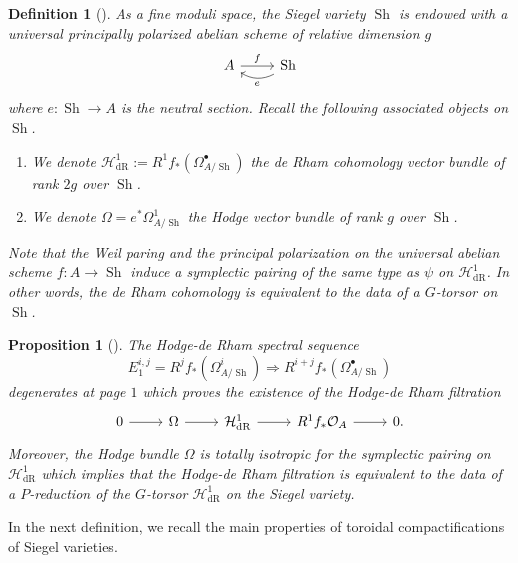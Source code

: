 \documentclass[11pt]{amsart}
\numberwithin{subsection}{section}
\numberwithin{figure}{section}
\numberwithin{table}{section}
\theoremstyle{1}
\newtheorem{proposition}[theorem]{Proposition}
\newtheorem{definition}[theorem]{Definition}
\theoremstyle{2}
\DeclareMathOperator{\Sh}{Sh}
\DeclareMathOperator{\dR}{dR}
\begin{document}
\begin{definition}[\cite{MR1083353}]
As a fine moduli space, the Siegel variety $\Sh$ is endowed with a universal principally polarized abelian scheme of relative dimension $g$
\begin{equation*}
\begin{tikzcd}
A \arrow[r, "f"] & \Sh\arrow[l, "e", bend left]
\end{tikzcd}
\end{equation*}
where $e : \Sh \rightarrow A$ is the neutral section. Recall the following associated objects on $\Sh$.
\begin{enumerate}
\item We denote $\mathcal{H}^1_{\dR} := R^1f_*(\Omega^{\bullet}_{A/\Sh})$ the de Rham cohomology vector bundle of rank $2g$ over $\Sh$.
\item We denote $\Omega =e^*\Omega^1_{A/\Sh}$ the Hodge vector bundle of rank $g$ over $\Sh$.
\end{enumerate}
Note that the Weil paring and the principal polarization on the universal abelian scheme $f : A \rightarrow \Sh$ induce a symplectic pairing of the same type as $\psi$ on $\mathcal{H}^1_{\dR}$. In other words, the de Rham cohomology is equivalent to the data of a $G$-torsor on $\Sh$.
\end{definition}
\vspace*{0.2cm}
\begin{proposition}[\cite{MR894379}]
The Hodge-de Rham spectral sequence 
\begin{equation*}
E_1^{i,j} = R^jf_*(\Omega^i_{A/\Sh}) \Rightarrow R^{i+j}f_*(\Omega^{\bullet}_{A/\Sh})
\end{equation*}
degenerates at page $1$ which proves the existence of the Hodge-de Rham filtration
\begin{equation*}
\begin{tikzcd}
0 \arrow[r] & \Omega \arrow[r] & \mathcal{H}^1_{\dR} \arrow[r] & R^1f_*\mathcal{O}_{A} \arrow[r] & 0.
\end{tikzcd}
\end{equation*}
Moreover, the Hodge bundle $\Omega$ is totally isotropic for the symplectic pairing on $\mathcal{H}^1_{\dR}$ which implies that the Hodge-de Rham filtration is equivalent to the data of a $P$-reduction of the $G$-torsor $\mathcal{H}^1_{\dR}$ on the Siegel variety. 
\end{proposition}
\vspace*{0.2cm}
In the next definition, we recall the main properties of toroidal compactifications of Siegel varieties.
\end{document}

